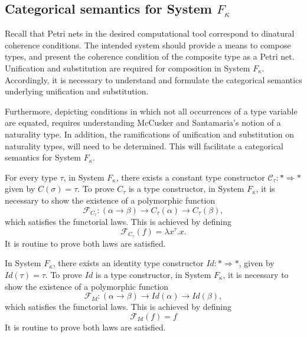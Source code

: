 \documentclass[../../Dissertation.tex]{subfiles}
\begin{document}
\usetikzlibrary{arrows,shapes,automata,petri,cd}


\subsection{Categorical semantics for System $F_\kappa$}
Recall that Petri nets in the desired computational tool correspond to dinatural coherence conditions. The intended system should provide a means to compose types, and present the coherence condition of the composite type as a Petri net. Unification and substitution are required for composition in System $F_\kappa$. Accordingly, it is necessary to understand and formulate the categorical semantics underlying unification and substitution. 
\par
Furthermore, depicting conditions in which not all occurrences of a type variable are equated, requires understanding McCusker and Santamaria's notion of a naturality type. In addition, the ramifications of unification and substitution on naturality types, will need to be determined. This will facilitate a categorical semantics for System $F_\kappa$.

\begin{proposition}\label{props:constant}
For every type $\tau$, in System $F_\kappa$, there exists a constant type constructor $\mathcal{C}_\tau : * \Rightarrow *$ given by $C (\sigma) = \tau$. To prove $C_\tau$ is a type constructor, in System $F_\kappa$, it is necessary to show the existence of a polymorphic function
\begin{equation*}
\mathcal{F}_{C_\tau} : (\alpha \rightarrow \beta) \rightarrow C_\tau (\alpha) \rightarrow C_\tau (\beta),
\end{equation*}
which satisfies the functorial laws. This is achieved by defining 
\begin{equation*}
\mathcal{F}_{C_\tau}(f) = \lambda x^\tau.x. 
\end{equation*}
It is routine to prove both laws are satisfied.
\end{proposition}

\begin{proposition}\label{props:id}
In System $F_\kappa$, there exists an identity type constructor $Id : * \Rightarrow *$, given by $Id(\tau) = \tau$. To prove $Id$ is a type constructor, in System $F_\kappa$, it is necessary to show the existence of a polymorphic function
\begin{equation*}
\mathcal{F}_{Id} : (\alpha \rightarrow \beta) \rightarrow Id (\alpha) \rightarrow Id (\beta),
\end{equation*}
which satisfies the functorial laws. This is achieved by defining 
\begin{equation*}
\mathcal{F}_{Id}(f) = f
\end{equation*}
It is routine to prove both laws are satisfied.
\end{proposition}
\end{document}
